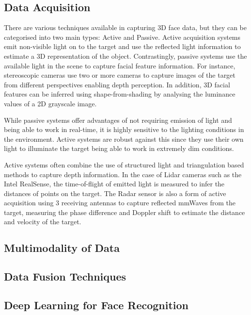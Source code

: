 \documentclass{interim}
\begin{document}
\subsection{Data Acquisition}
There are various techniques available in capturing 3D face data, but they can be categorised into two main types: Active and Passive. Active acquisition systems emit non-visible light on to the target and use the reflected light information to estimate a 3D representation of the object. Contrastingly, passive systems use the available light in the scene to capture facial feature information. For instance, stereoscopic cameras use two or more cameras to capture images of the target from different perspectives enabling depth perception. In addition, 3D facial features can be inferred using shape-from-shading by analysing the luminance values of a 2D grayscale image. 

While passive systems offer advantages of not requiring emission of light and being able to work in real-time, it is highly sensitive to the lighting conditions in the environment. Active systems are robust against this since they use their own light to illuminate the target being able to work in extremely dim conditions. 

Active systems often combine the use of structured light and triangulation based methods to capture depth information. In the case of Lidar cameras such as the Intel RealSense, the time-of-flight of emitted light is measured to infer the distances of points on the target. The Radar sensor is also a form of active acquisition using 3 receiving antennas to capture reflected mmWaves from the target, measuring the phase difference and Doppler shift to estimate the distance and velocity of the target. 

\subsection{Multimodality of Data}

\subsection{Data Fusion Techniques}

\subsection{Deep Learning for Face Recognition}

\end{document}
